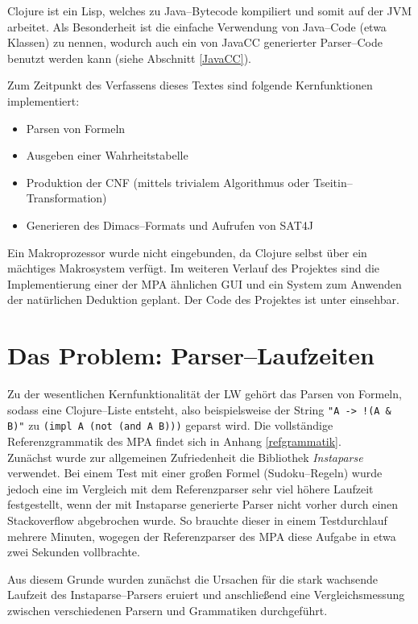 \documentclass[ngerman,a4paper,abstracton,open=right,twoside=false,toc=listofnumbered,bibtotocnumbered]{scrreprt}
\begin{document}
Clojure ist ein Lisp, welches zu Java--Bytecode kompiliert und somit auf der JVM arbeitet. Als Besonderheit ist die einfache Verwendung von Java--Code (etwa Klassen) zu nennen, wodurch auch ein von JavaCC generierter Parser--Code benutzt werden kann (siehe Abschnitt \ref{JavaCC}).

Zum Zeitpunkt des Verfassens dieses Textes sind folgende Kernfunktionen implementiert:

\begin{itemize}
	\item Parsen von Formeln
	\item Ausgeben einer Wahrheitstabelle
	\item Produktion der CNF (mittels trivialem Algorithmus oder Tseitin--Transformation)
	\item Generieren des Dimacs--Formats und Aufrufen von SAT4J
\end{itemize}

Ein Makroprozessor wurde nicht eingebunden, da Clojure selbst über ein mächtiges Makrosystem verfügt. Im weiteren Verlauf des Projektes sind die Implementierung einer der MPA ähnlichen GUI und ein System zum Anwenden der natürlichen Deduktion geplant. Der Code des Projektes ist unter \cite{lw} einsehbar.

\section{Das Problem: Parser--Laufzeiten}

Zu der wesentlichen Kernfunktionalität der LW gehört das Parsen von Formeln, sodass eine Clojure--Liste entsteht, also beispielsweise der String \lstinline|"A -> !(A & B)"| zu \lstinline|(impl A (not (and A B)))| geparst wird. Die vollständige Referenzgrammatik des MPA findet sich in Anhang \ref{refgrammatik}.\\

Zunächst wurde zur allgemeinen Zufriedenheit die Bibliothek \emph{Instaparse} verwendet. Bei einem Test mit einer großen Formel (Sudoku--Regeln) wurde jedoch eine im Vergleich mit dem Referenzparser sehr viel höhere Laufzeit festgestellt, wenn der mit Instaparse generierte Parser nicht vorher durch einen Stackoverflow abgebrochen wurde. So brauchte dieser in einem Testdurchlauf mehrere Minuten, wogegen der Referenzparser des MPA diese Aufgabe in etwa zwei Sekunden vollbrachte.

\newpage

Aus diesem Grunde wurden zunächst die Ursachen für die stark wachsende Laufzeit des Instaparse--Parsers eruiert und anschließend eine Vergleichsmessung zwischen verschiedenen Parsern und Grammatiken durchgeführt.
\end{document}
